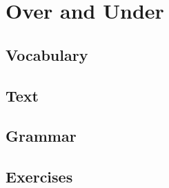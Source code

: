 \chapter{Over and Under}
\section*{Vocabulary}
\section*{Text}
\section*{Grammar}
\section*{Exercises}
